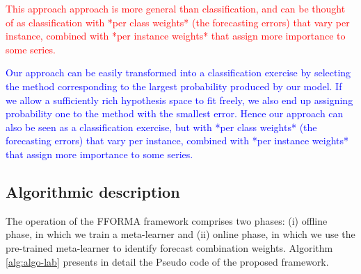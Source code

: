 \documentclass[11pt,a4paper,]{article}
\theoremstyle{definition}
\theoremstyle{definition}
\theoremstyle{definition}
\theoremstyle{remark}
\begin{document}
\textcolor{red}{This approach approach is more general than classification, and can be thought of as classification  with *per class weights* (the forecasting errors) that vary per instance, combined with *per instance weights* that assign more importance to some series.}

\textcolor{blue}{
Our approach can be easily transformed into a classification exercise by selecting the method corresponding to the largest probability produced by our model. If we allow a sufficiently rich hypothesis space to fit freely, we also end up assigning probability one to the method with the smallest error. Hence our approach can also be seen as a classification exercise, but with *per class weights* (the forecasting errors) that vary per instance, combined with *per instance weights* that assign more importance to some series.}

\subsection{Algorithmic description}\label{algorithmic-description}

The operation of the FFORMA framework comprises two phases: (i) offline
phase, in which we train a meta-learner and (ii) online phase, in which
we use the pre-trained meta-learner to identify forecast combination
weights. Algorithm \ref{alg:algo-lab} presents in detail the Pseudo code
of the proposed framework.
\end{document}
